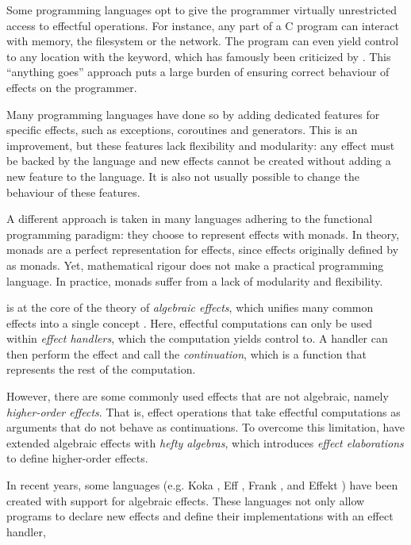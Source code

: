 Some programming languages opt to give the programmer virtually unrestricted access to effectful operations. For instance, any part of a C program can interact with memory, the filesystem or the network. The program can even yield control to any location with the  keyword, which has famously been criticized by \textcite{dijkstra_letters_1968}. This ``anything goes'' approach puts a large burden of ensuring correct behaviour of effects on the programmer.

Many programming languages have done so by adding dedicated features for specific effects, such as exceptions, coroutines and generators. This is an improvement, but these features lack flexibility and modularity: any effect must be backed by the language and new effects cannot be created without adding a new feature to the language. It is also not usually possible to change the behaviour of these features.

A different approach is taken in many languages adhering to the functional programming paradigm: they choose to represent effects with monads. In theory, monads are a perfect representation for effects, since effects originally defined by \textcite{moggi_notions_1991} as monads. Yet, mathematical rigour does not make a practical programming language. In practice, monads suffer from a lack of modularity and flexibility.\citationneeded

 is at the core of the theory of \emph{algebraic effects}, which unifies many common effects into a single concept \autocite{goos_adequacy_2001,castagna_handlers_2009}. Here, effectful computations can only be used within \emph{effect handlers}, which the computation yields control to. A handler can then perform the effect and call the \emph{continuation}, which is a function that represents the rest of the computation.

However, there are some commonly used effects that are not algebraic, namely \emph{higher-order effects}. That is, effect operations that take effectful computations as arguments that do not behave as continuations. To overcome this limitation, \textcite{bach_poulsen_hefty_2023} have extended algebraic effects with \emph{hefty algebras}, which introduces \emph{effect elaborations} to define higher-order effects.

In recent years, some languages (e.g. Koka \autocite{leijen_koka_2014}, Eff \autocite{bauer_programming_2015}, Frank \autocite{lindley_be_2017}, and Effekt \autocite{brachthauser_effects_2020}) have been created with support for algebraic effects. These languages not only allow programs to declare new effects and define their implementations with an effect handler,  

